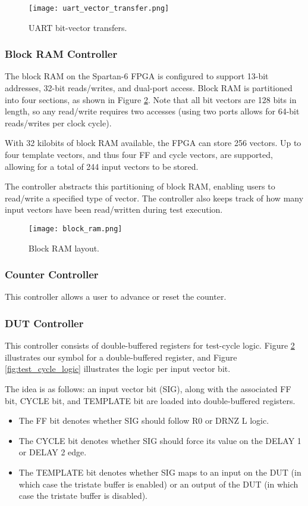 \begin{figure}
\texttt{[image: uart\_vector\_transfer.png]}
\caption{UART bit-vector transfers.}
\label{fig:uart_vector_transfer}
\end{figure}

\subsubsection{Block RAM Controller}
The block RAM on the Spartan-6 FPGA is configured to support 13-bit addresses, 32-bit reads/writes, and dual-port access. Block RAM is partitioned into four sections, as shown in Figure \ref{fig:block_ram_layout}. Note that all bit vectors are 128 bits in length, so any read/write requires two accesses (using two ports allows for 64-bit reads/writes per clock cycle).

With 32 kilobits of block RAM available, the FPGA can store 256 vectors. Up to four template vectors, and thus four FF and cycle vectors, are supported, allowing for a total of 244 input vectors to be stored.

The controller abstracts this partitioning of block RAM, enabling users to read/write a specified type of vector. The controller also keeps track of how many input vectors have been read/written during test execution.

\begin{figure}
\texttt{[image: block\_ram.png]}
\caption{Block RAM layout.}
\label{fig:block_ram_layout}
\end{figure}

\subsubsection{Counter Controller}
This controller allows a user to advance or reset the counter.

\subsubsection{DUT Controller}
This controller consists of double-buffered registers for test-cycle logic. Figure \ref{fig:block_ram_layout} illustrates our symbol for a double-buffered register, and Figure \ref{fig:test_cycle_logic} illustrates the logic per input vector bit.

The idea is as follows: an input vector bit (SIG), along with the associated FF bit, CYCLE bit, and TEMPLATE bit are loaded into double-buffered registers. 
\begin{itemize}
\item The FF bit denotes whether SIG should follow R0 or DRNZ L logic.
\item The CYCLE bit denotes whether SIG should force its value on the DELAY 1 or DELAY 2 edge. 
\item The TEMPLATE bit denotes whether SIG maps to an input on the DUT (in which case the tristate buffer is enabled) or an output of the DUT (in which case the tristate buffer is disabled).
\end{itemize}

